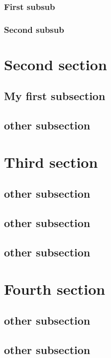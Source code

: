 \documentclass{book}
\begin{document}
\subsubsection{First subsub}

\subsubsection{Second subsub}


\section{Second section}

\subsection{My first subsection}

\subsection{other subsection}

\section{Third section}
\subsection{other subsection}

\subsection{other subsection}
\subsection{other subsection}

\section{Fourth section}


\subsection{other subsection}

\subsection{other subsection}
\end{document}
